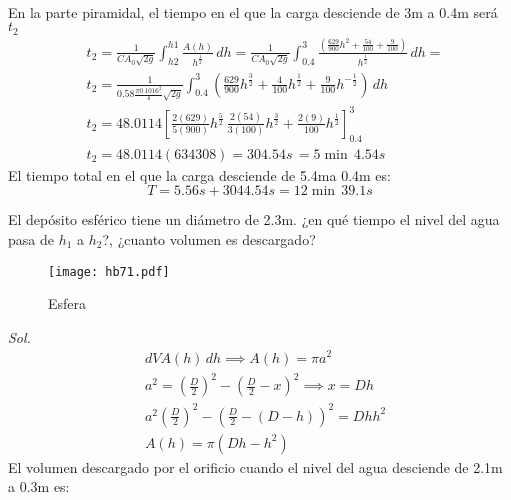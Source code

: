 \begin{enumerate}
\begin{align*}
    \end{align*}
    En la parte piramidal, el tiempo en el que la carga desciende de 3m a 0.4m será $t_2$
    \begin{align*}
        &t_2 = \frac{1}{CA_0 \sqrt{2g}}\int_{h2}^{h1} \frac{A(h)}{h^{\frac{1}{2}}}\,dh = \frac{1}{CA_0 \sqrt{2g}}\int_{0.4}^3 \frac{\left(\frac{629}{900}h^2 +\frac{54}{100} + \frac{9}{100} \right)}{h^{\frac{1}{2}}}\,dh =\\
        &t_2 = \frac{1}{0.58 \frac{\pi 0.1016^2}{4} \sqrt{2g}}\int_{0.4}^3 \left(\frac{629}{900}h^{\frac{3}{2}} + \frac{4}{100}h^{\frac{1}{2}} + \frac{9}{100}h^{ - \frac{1}{2}}\right)\,dh\\
        &t_2 = 48.0114 \left[\frac{2(629)}{5(900)}h^{\frac{5}{2}}\, \frac{2(54)}{3(100)}h^{\frac{3}{2}} + \frac{2(9)}{100}h^{\frac{1}{2}} \right]^{3}_{0.4}\\
        &t_2 = 48.0114(634308) = 304.54s\, = 5\min \, 4.54s
    \end{align*}
    El tiempo total en el que la carga desciende de 5.4ma 0.4m es:
    \begin{equation*}
        T = 5.56s + 3044.54s = 12\min \, 39.1s
    \end{equation*}
\end{enumerate}


\begin{example}
    El depósito esférico tiene un diámetro de 2.3m. ¿en qué tiempo el nivel del agua pasa de $h_1$ a $h_2$?, ¿cuanto volumen es descargado?
\end{example}

\begin{figure}[h!]
\centering
  \texttt{[image: hb71.pdf]}
  \caption{Esfera}
  \label{hb71}
\end{figure}
\textit{ Sol. }
\begin{align*}
    &dV A(h)\,dh\implies A(h) =\pi a^2\\
    &a^2 = \left(\frac{D}{2}\right)^2- \left(\frac{D}{2} - x\right)^2\implies x = D h\\
    &a^2  \left(\frac{D}{2}\right)^2 -\left(\frac{D}{2} -(D - h)\right)^2 = Dh h^2\\ 
    &A(h) =\pi (Dh - h^2)
\end{align*}
El volumen descargado por el orificio cuando el nivel del agua desciende de 2.1m a 0.3m es:

